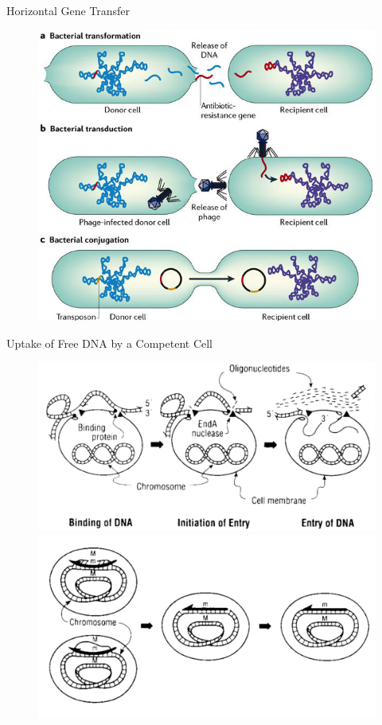 \documentclass{beamer}
\begin{document}
\begin{frame}{Horizontal Gene Transfer}
\begin{figure}
\includegraphics[width=0.65\linewidth]{images/HGT.jpg}\\
\hspace*{11pt}\hbox{\scriptsize {}}
\end{figure}
\end{frame}

\begin{frame}{Uptake of Free DNA by a Competent Cell}
\begin{figure}
\includegraphics[width=0.5\linewidth]{images/intake.png}\\
\includegraphics[width=0.5\linewidth]{images/recombination.png}\\
\hspace*{11pt}\hbox{\scriptsize {}}
\end{figure}
\end{frame}
\end{document}
